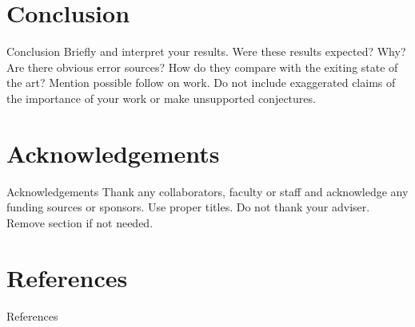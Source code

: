 \documentclass[pdf]{beamer}
\begin{document}
\begin{frame}[fragile]
\begin{columns}
\begin{column}{0.25\textwidth}
\begin{minipage}[t][\textheight]{\linewidth}
\section{Conclusion}
\begin{block}{Conclusion}
\small Briefly and interpret your results. Were these results expected? Why? Are there obvious error sources? How do they compare with the exiting state of the art?   Mention possible follow on work.   Do not include exaggerated claims of the importance of your work or make unsupported conjectures. 
\end{block}
\vfill

\section*{Acknowledgements}
\begin{block}{Acknowledgements}
\small Thank any collaborators, faculty or staff and acknowledge any funding sources or sponsors. Use proper titles.  Do not thank your adviser. Remove section if not needed.
\end{block}
\vfill

\section*{References}
\begin{block}{References}
\nocite{bingulac1994on, vidmar1992on}

\scriptsize
\end{block}
\end{minipage}
\end{column}

\end{columns}
\end{frame}
\end{document}
